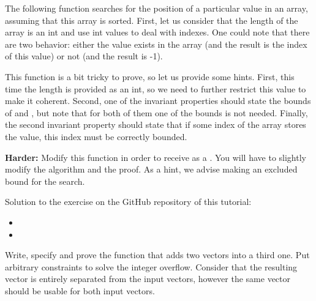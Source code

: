 



\label{l4:statements-loops-ex-bsearch}


The following function searches for the position of a particular value in an
array, assuming that this array is sorted. First, let us consider that the
length of the array is an int and use int values to deal with indexes. One
could note that there are two behavior: either the value exists in the array
(and the result is the index of this value) or not (and the result is -1).




This function is a bit tricky to prove, so let us provide some hints. First,
this time the length is provided as an int, so we need to further restrict
this value to make it coherent. Second, one of the invariant properties
should state the bounds of  and , but note
that for both of them one of the bounds is not needed. Finally, the second
invariant property should state that if some index of the array stores the
value, this index must be correctly bounded.


\textbf{Harder:} Modify this function in order to receive 
as a . You will have to slightly modify the algorithm
and the proof. As a hint, we advise making  an excluded
bound for the search.


\begin{Information}
  Solution to the exercise on the GitHub repository of this tutorial:
  \begin{itemize}
    \item {}
    \item {}
  \end{itemize}
\end{Information}




Write, specify and prove the function that adds two vectors into a third
one. Put arbitrary constraints to solve the integer overflow. Consider that
the resulting vector is entirely separated from the input vectors, however
the same vector should be usable for both input vectors.




